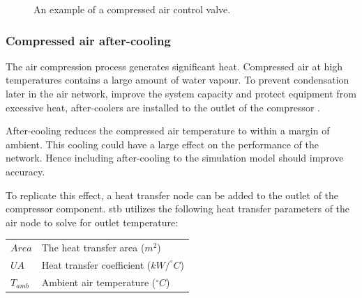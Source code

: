 		\begin{figure}[h]
			\centering
			\caption[An example of a compressed air control valve.]{An example of a compressed air control valve\cite{van2015implementation}.} 
			\label{fig: Control}
		\end{figure}
		\subsubsection{Compressed air after-cooling}
		The air compression process generates significant heat. Compressed air at high temperatures contains a large amount of water vapour. To prevent condensation later in the air network, improve the system capacity and protect equipment from excessive heat, after-coolers are installed to the outlet of the compressor \cite{schroeder2009energy}.
		\par 
		After-cooling reduces the compressed air temperature to within a margin of ambient. This cooling could have a large effect on the performance of the network. Hence including after-cooling to the simulation model should improve accuracy.
		\par 
		To replicate this effect, a heat transfer node can be added to the outlet of the compressor component. \gls{stb} utilizes the following heat transfer parameters of the air node to solve for outlet temperature:
		\par 
		\begin{tabular}{p{1.3cm}p{13cm}}
			$Area$ & The heat transfer area ($m^2$) \\
			$UA$ & Heat transfer coefficient ($kW/^{\circ} C$) \\
			$T_{amb}$ & Ambient air temperature ($^{\circ} C$) \\
		\end{tabular} \\	
